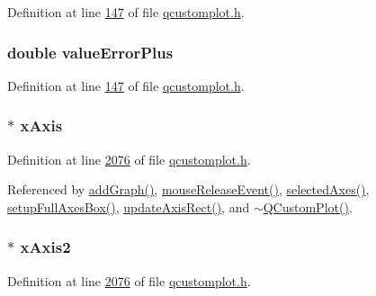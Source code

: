 Definition at line \hyperlink{a00116_source_l00147}{147} of file \hyperlink{a00116_source}{qcustomplot.\+h}.

\hypertarget{a00116_a6d93a38079a2b52118982e82673e87a3}{
\subsubsection[{value\+Error\+Plus}]{\setlength{\rightskip}{0pt plus 5cm}double value\+Error\+Plus}}\label{a00116_a6d93a38079a2b52118982e82673e87a3}


Definition at line \hyperlink{a00116_source_l00147}{147} of file \hyperlink{a00116_source}{qcustomplot.\+h}.

\hypertarget{a00116_a384438707adbcc96b0fa1324106f7129}{
\subsubsection[{x\+Axis}]{$\ast$ x\+Axis}}\label{a00116_a384438707adbcc96b0fa1324106f7129}


Definition at line \hyperlink{a00116_source_l02076}{2076} of file \hyperlink{a00116_source}{qcustomplot.\+h}.



Referenced by \hyperlink{a00115_source_l06688}{add\+Graph()}, \hyperlink{a00115_source_l07691}{mouse\+Release\+Event()}, \hyperlink{a00115_source_l07154}{selected\+Axes()}, \hyperlink{a00115_source_l07265}{setup\+Full\+Axes\+Box()}, \hyperlink{a00115_source_l08116}{update\+Axis\+Rect()}, and \hyperlink{a00115_source_l05836}{$\sim$\+Q\+Custom\+Plot()}.

\hypertarget{a00116_a058f6d3a4c86bf94c476e5c380711dba}{
\subsubsection[{x\+Axis2}]{ $\ast$ x\+Axis2}}\label{a00116_a058f6d3a4c86bf94c476e5c380711dba}


Definition at line \hyperlink{a00116_source_l02076}{2076} of file \hyperlink{a00116_source}{qcustomplot.\+h}.



